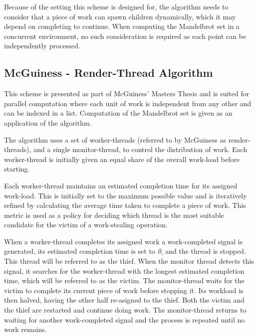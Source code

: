 Because of the setting this scheme is designed for, the algorithm needs to consider that
a piece of work can spawn children dynamically, which it may depend on completing to continue. 
When computing the Mandelbrot set in a concurrent environment, no such consideration is required 
as each point can be independently processed.

\subsection{McGuiness - Render-Thread Algorithm}
\label{sec:rendscheme}

This scheme is presented as part of McGuiness' Masters Thesis \cite{jmcguin} and is suited for parallel computation where each unit of work is independent 
from any other and can be indexed in a list. Computation of the Mandelbrot set is given as an application of the algorithm. 

The algorithm uses a set of \glspl{worker-thread} (referred to by McGuiness as render-threads), 
and a single \gls{monitor-thread}, to control the distribution of work. Each \gls{worker-thread} is
initially given an equal share of the overall work-load before starting.

Each \gls{worker-thread} maintains an estimated completion time for its assigned work-load. This is initially set to the maximum possible value and
is iteratively refined by calculating the average time taken to complete a piece of work. This metric is used as a policy for deciding which
thread is the most suitable candidate for the victim of a work-stealing operation.

When a worker-thread completes its assigned work a work-completed signal is generated, its estimated
completion time is set to \textit{0}, and the thread is stopped. This thread will be referred to as the \gls{thief}.
When the monitor thread detects this signal, it searches for the worker-thread with the longest estimated completion time, 
which will be referred to as the \gls{victim}. The \gls{monitor-thread} waits for the victim to complete its current piece of work before stopping it.
Its workload is then halved, having the other half re-asigned to the thief. Both the victim and the thief are restarted and continue doing work.
The monitor-thread returns to waiting for another work-completed signal and the process is repeated until no work remains.

